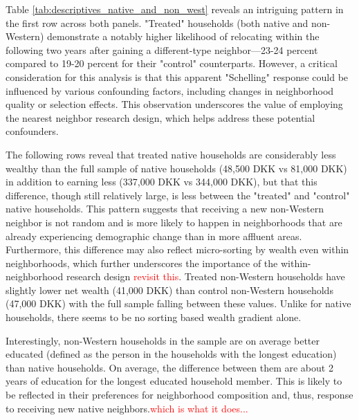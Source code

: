 \documentclass[main.tex]{subfiles}
\begin{document}
Table \ref{tab:descriptives_native_and_non_west} reveals an intriguing pattern in the first row across both panels. "Treated" households (both native and non-Western) demonstrate a notably higher likelihood of relocating within the following two years after gaining a different-type neighbor—23-24 percent compared to 19-20 percent for their "control" counterparts. However, a critical consideration for this analysis is that this apparent "Schelling" response could be influenced by various confounding factors, including changes in neighborhood quality or selection effects. This observation underscores the value of employing the nearest neighbor research design, which helps address these potential confounders.

The following rows reveal that treated native households are considerably less wealthy than the full sample of native households (48,500 DKK vs 81,000 DKK) in addition to earning less (337,000 DKK vs 344,000 DKK), but that this difference, though still relatively large, is less between the "treated" and "control" native households. This pattern suggests that receiving a new non-Western neighbor is not random and is more likely to happen in neighborhoods that are already experiencing demographic change than in more affluent areas. Furthermore, this difference may also reflect micro-sorting by wealth even within neighborhoods, which further underscores the importance of the within-neighborhood research design \textcolor{red}{revisit this}. Treated non-Western households have slightly lower net wealth (41,000 DKK) than control non-Western households (47,000 DKK) with the full sample falling between these values. Unlike for native households, there seems to be no sorting based wealth gradient alone.   

Interestingly, non-Western households in the sample are on average better educated (defined as the person in the households with the longest education) than native households. On average, the difference between them are about 2 years of education for the longest educated household member. This is likely to be reflected in their preferences for neighborhood composition and, thus, response to receiving new native neighbors.\textcolor{red}{which is what it does...}
\end{document}
